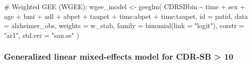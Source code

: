 \documentclass[
  9pt,
  letterpaper,
  DIV=11,
  numbers=noendperiod]{scrartcl}
\newenvironment{Shaded}{\begin{snugshade}}{\end{snugshade}}
\newcommand{\AttributeTok}[1]{\textcolor[rgb]{0.40,0.45,0.13}{#1}}
\newcommand{\CommentTok}[1]{\textcolor[rgb]{0.37,0.37,0.37}{#1}}
\newcommand{\FunctionTok}[1]{\textcolor[rgb]{0.28,0.35,0.67}{#1}}
\newcommand{\NormalTok}[1]{\textcolor[rgb]{0.00,0.23,0.31}{#1}}
\newcommand{\OtherTok}[1]{\textcolor[rgb]{0.00,0.23,0.31}{#1}}
\newcommand{\SpecialCharTok}[1]{\textcolor[rgb]{0.37,0.37,0.37}{#1}}
\newcommand{\StringTok}[1]{\textcolor[rgb]{0.13,0.47,0.30}{#1}}
\begin{document}
\begin{Shaded}
\begin{Highlighting}[]
\CommentTok{\# Weighted GEE (WGEE): }
\NormalTok{wgee\_model }\OtherTok{\textless{}{-}} \FunctionTok{geeglm}\NormalTok{(}
\NormalTok{  CDRSBbin }\SpecialCharTok{\textasciitilde{}}\NormalTok{ time }\SpecialCharTok{+}\NormalTok{ sex }\SpecialCharTok{+}\NormalTok{ age }\SpecialCharTok{+}\NormalTok{ bmi }\SpecialCharTok{+}
\NormalTok{    adl }\SpecialCharTok{+}\NormalTok{ abpet }\SpecialCharTok{+}\NormalTok{ taupet }\SpecialCharTok{+}
\NormalTok{    time}\SpecialCharTok{:}\NormalTok{abpet }\SpecialCharTok{+}\NormalTok{ time}\SpecialCharTok{:}\NormalTok{taupet,}
  \AttributeTok{id      =}\NormalTok{ patid,}
  \AttributeTok{data    =}\NormalTok{ alzheimer\_obs,}
  \AttributeTok{weights =}\NormalTok{ w\_stab,                 }
  \AttributeTok{family  =} \FunctionTok{binomial}\NormalTok{(}\AttributeTok{link =} \StringTok{"logit"}\NormalTok{),}
  \AttributeTok{corstr  =} \StringTok{"ar1"}\NormalTok{,}
  \AttributeTok{std.err =} \StringTok{"san.se"}
\NormalTok{)}
\end{Highlighting}
\end{Shaded}

\subsubsection{Generalized linear mixed-effects model for CDR-SB
\textgreater{}
10}\label{generalized-linear-mixed-effects-model-for-cdr-sb-10}
\end{document}
